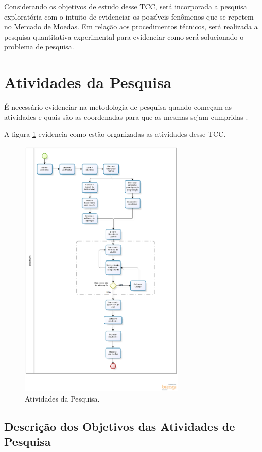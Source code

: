 Considerando os objetivos de estudo desse TCC, será incorporada a pesquisa exploratória com o intuito de evidenciar os possíveis fenômenos que se repetem no Mercado de Moedas. Em relação aos procedimentos técnicos, será realizada a pesquisa quantitativa experimental para evidenciar como será solucionado o problema de pesquisa.

\section{Atividades da Pesquisa}

É necessário evidenciar na metodologia de pesquisa quando começam as atividades e quais são as coordenadas para que as mesmas sejam cumpridas \cite{forcon2014}.

A figura \ref{metodologia} evidencia como estão organizadas as atividades desse TCC.

\begin{figure}[htp]
\centering
\includegraphics[width=0.7\textwidth]{figuras/metodologia}
\caption{Atividades da Pesquisa.} 
\label{metodologia}
\end{figure}

\subsection{Descrição dos Objetivos das Atividades de Pesquisa}

